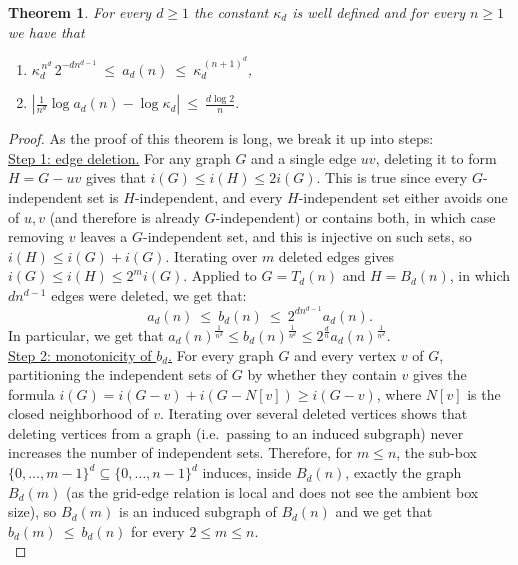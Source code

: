 \documentclass[10pt,a4paper]{amsart}
\newtheorem{theorem}{Theorem}
\begin{document}
\begin{theorem}\label{thm:existence}
For every $d\ge1$ the constant $\kappa_d$ is well defined and for every $n\ge1$ we have that 

\begin{enumerate}
    \item $\kappa_d^{\,n^d}\,2^{-dn^{d-1}}\ \le\ a_d(n)\ \le\ \kappa_d^{\,(n+1)^d}$, 
    \item $
\left|\frac1{n^d}\log a_d(n)-\log\kappa_d\right|\ \le\ \frac{d\log2}n.$
\end{enumerate}
\end{theorem}

\begin{proof}
As the proof of this theorem is long, we break it up into steps:\\

\underline{Step 1: edge deletion.} For any graph $G$ and a single edge $uv$, deleting it to form $H=G-uv$ gives that $i(G)\le i(H)\le2i(G)$. This is true since every $G$-independent set is $H$-independent, and every $H$-independent set either avoids one of $u,v$ (and therefore is already $G$-independent) or contains both, in which case removing $v$ leaves a $G$-independent set, and this is injective on such sets, so $i(H)\le i(G)+i(G)$. Iterating over $m$ deleted edges gives $i(G)\le i(H)\le2^mi(G)$. Applied to $G =T_d(n)$ and $H=B_d(n)$, in which $dn^{d-1}$ edges were deleted, we get that:
\begin{equation*}\label{eq:torusgridcompare}
a_d(n)\ \le\ b_d(n)\ \le\ 2^{dn^{d-1}}a_d(n).
\end{equation*}
In particular, we get that $a_d(n)^{\frac{1}{n^d}} \leq b_d(n)^{\frac{1}{n^d}} \leq 2^{\frac{d}{n}}a_d(n)^{\frac{1}{n^d}}$.\\

\underline{Step 2: monotonicity of $b_d$.} For every graph $G$ and every vertex $v$ of $G$, partitioning the independent sets of $G$ by whether they contain $v$ gives the formula $i(G)=i(G-v)+i(G-N[v])\ge i(G-v)$, where $N[v]$ is the closed neighborhood of $v$. Iterating over several deleted vertices shows that deleting vertices from a graph (i.e.\ passing to an induced subgraph) never increases the number of independent sets. Therefore, for $m\le n$, the sub-box $\{0,\dots,m-1\}^d\subseteq\{0,\dots,n-1\}^d$ induces, inside $B_d(n)$, exactly the graph $B_d(m)$ (as the grid-edge relation is local and does not see the ambient box size), so $B_d(m)$ is an induced subgraph of $B_d(n)$ and we get that $b_d(m)\ \le\ b_d(n)$ for every $2 \leq m \leq n$. \\


\end{proof}
\end{document}
